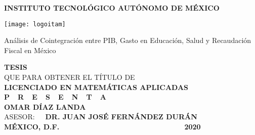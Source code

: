 \begin{titlepage}
    \begin{center}
        
        \vspace{0.2cm}

        \large
        \textbf{INSTITUTO TECNOL\'OGICO AUT\'ONOMO DE M\'EXICO}

        \vspace{1.2cm}
        
        \texttt{[image: logoitam]}
        
        \vspace{0.8cm}
        \LARGE
        Análisis de Cointegración entre PIB, Gasto en Educación, Salud y Recaudación Fiscal en México
        
        \vspace{1.1cm}
        
        \normalsize \textbf{TESIS}\\ QUE PARA OBTENER EL T\'ITULO DE\\ \textbf{LICENCIADO EN MATEM\'ATICAS APLICADAS}\\[0.8cm]
        \normalsize \textbf{P\ \  R\ \  E\ \  S\ \  E\ \  N\ \  T\ \  A}\\[0.8cm]

        \textbf{OMAR D\'IAZ LANDA}\\[1.0cm]

        \normalsize ASESOR: \textbf{\ \ DR. JUAN JOSÉ FERN\'ANDEZ DUR\'AN}\\[1.0cm]

        \normalsize \textbf{M\'EXICO, D.F.} {\ \ \ \ \ \ \ \ \ \ \ \ \ \ \ \ \ \ \ \ \ \ \ \ \ \ \ \ \ \ \ \ \ \ } \textbf{2020}
    \end{center}
\end{titlepage}